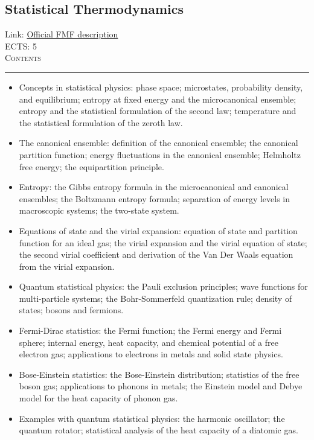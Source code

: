 \documentclass[11pt, a4paper]{article}
\newenvironment{course}[3]{
\subsection{#1}%
Link: \href{#2}{Official FMF description}\\%
ECTS: #3%
\vspace{1ex}
\\
{\large \textsc{Contents}}\\[-0.9ex]%
\rule{\textwidth}{0.5pt}
\vspace{-3ex}
}
{}
\newenvironment{chapter}[1]{
\begin{tcolorbox}[title=#1, breakable]
}
{\end{tcolorbox}}
\begin{document}
\begin{course}{Statistical Thermodynamics}{https://www.fmf.uni-lj.si/en/study-physics/programmes/1fiz/2020/7000777/courses/1174/}{5}
    \begin{chapter}{Part 2: Statistical physics}
        \begin{itemize}
        
            \item Concepts in statistical physics: phase space; microstates, probability density, and equilibrium; entropy at fixed energy and the microcanonical ensemble; entropy and the statistical formulation of the second law; temperature and the statistical formulation of the zeroth law.

            \item The canonical ensemble: definition of the canonical ensemble; the canonical partition function; energy fluctuations in the canonical ensemble; Helmholtz free energy; the equipartition principle.

            \item Entropy: the Gibbs entropy formula in the microcanonical and canonical ensembles; the Boltzmann entropy formula; separation of energy levels in macroscopic systems; the two-state system.

            \item Equations of state and the virial expansion: equation of state and partition function for an ideal gas; the virial expansion and the virial equation of state; the second virial coefficient and derivation of the Van Der Waals equation from the virial expansion.

            \item Quantum statistical physics: the Pauli exclusion principles; wave functions for multi-particle systems; the Bohr-Sommerfeld quantization rule; density of states; bosons and fermions.

            \item Fermi-Dirac statistics: the Fermi function; the Fermi energy and Fermi sphere; internal energy, heat capacity, and chemical potential of a free electron gas; applications to electrons in metals and solid state physics.

            \item Bose-Einstein statistics: the Bose-Einstein distribution; statistics of the free boson gas; applications to phonons in metals; the Einstein model and Debye model for the heat capacity of phonon gas.

            \item Examples with quantum statistical physics: the harmonic oscillator; the quantum rotator; statistical analysis of the heat capacity of a diatomic gas.


\end{itemize}
\end{chapter}
\end{course}
\end{document}
